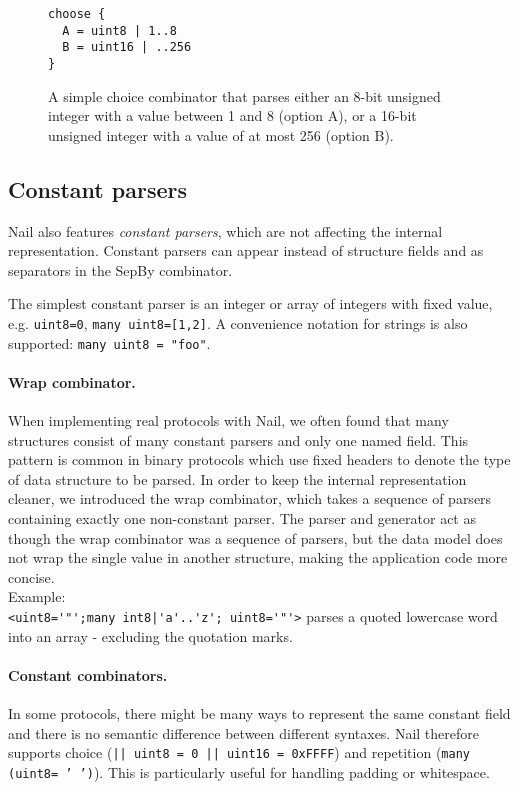 \begin{figure}[tb]
\begin{verbatim}
choose {
  A = uint8 | 1..8
  B = uint16 | ..256
}
\end{verbatim}
\caption{A simple choice combinator that parses either an 8-bit unsigned
integer with a value between 1 and 8 (option A), or a 16-bit unsigned
integer with a value of at most 256 (option B).}
\label{fig:choice}
\end{figure}

\subsection{Constant parsers}

Nail also features \emph{constant parsers}, which are not affecting the internal
representation. Constant parsers can appear instead of structure fields and as
separators in the SepBy combinator.

The simplest constant parser is an integer or array of integers with fixed
value, e.g. \texttt{uint8=0}, \texttt{many uint8=[1,2]}. A convenience notation
for strings is also supported: \texttt{many uint8 = "foo"}.

\paragraph{Wrap combinator.} When implementing real protocols with Nail, we often found that many structures
consist of many constant parsers and only one named field. This pattern is
common in binary protocols which use fixed headers to denote the type of data
structure to be parsed.  In order to keep the internal representation cleaner,
we introduced the wrap combinator, which takes a sequence of parsers containing
exactly one non-constant parser. The parser and generator act as though the wrap
combinator was a sequence of parsers, but the data model does not wrap the
single value in another structure, making the application code more concise.\\
Example: \\ \verb+<uint8='"';many int8|'a'..'z'; uint8='"'>+  parses a quoted
lowercase word into an array - excluding the quotation marks.

\paragraph{Constant combinators.}
In some protocols, there might be many ways to represent the same constant field
and there is no semantic difference between different syntaxes.  Nail therefore
supports choice (\texttt{|| uint8 = 0 || uint16 = 0xFFFF}) and repetition
(\texttt{many (uint8= ' ')}). This is particularly useful for handling padding or whitespace.

